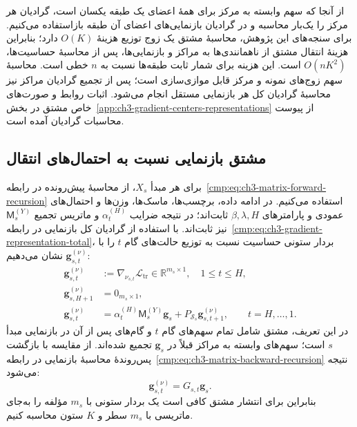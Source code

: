 از آنجا که سهم وابسته به مرکز برای همهٔ
اعضای یک طبقه یکسان است، گرادیان هر مرکز
را یک‌بار محاسبه و در گرادیان بازنمایی‌های
اعضای آن طبقه بازاستفاده می‌کنیم. برای سنجه‌های
این پژوهش، محاسبهٔ مشتق یک زوج توزیع هزینهٔ
$O(K)$ دارد؛ بنابراین هزینهٔ انتقال مشتق از
ناهمانندی‌ها به مراکز و بازنمایی‌ها، پس از
محاسبهٔ حساسیت‌ها، $O(nK^2)$ است. این هزینه
برای شمار ثابت طبقه‌ها نسبت به $n$ خطی است.
محاسبهٔ سهم زوج‌های نمونه و مرکز قابل موازی‌سازی
است؛ پس از تجمیع گرادیان مراکز نیز محاسبهٔ
گرادیان کل هر بازنمایی مستقل انجام می‌شود.
اثبات روابط و صورت‌های خاص مشتق در
بخش~\ref{app:ch3-gradient-centers-representations}
از پیوست محاسبات گرادیان آمده است.

\subsection{مشتق بازنمایی نسبت به احتمال‌های انتقال}
\label{cmp:subsec:ch3-gradient-exact-walk}

برای هر مبدأ $X_s$، از محاسبهٔ پیش‌رونده در
رابطه~\eqref{cmp:eq:ch3-matrix-forward-recursion}
استفاده می‌کنیم. در ادامه داده، برچسب‌ها،
ماسک‌ها، وزن‌ها و احتمال‌های عمودی و پارامترهای
$\beta,\lambda,H$ ثابت‌اند؛ در نتیجه ضرایب
$\alpha_t^{(H)}$ و ماتریس تجمیع
$\mathsf M_s^{(Y)}$ نیز ثابت‌اند.
با استفاده از گرادیان کل بازنمایی در
رابطه~\eqref{cmp:eq:ch3-gradient-representation-total}،
بردار ستونی حساسیت نسبت به توزیع حالت‌های گام
$t$ را با $\mathbf g_{s,t}^{(\nu)}$ نشان می‌دهیم:
\begin{equation}\label{cmp:eq:ch3-gradient-walk-adjoint}
\boxed{\begin{aligned}
\mathbf g_{s,t}^{(\nu)}
&:=\nabla_{\nu_{s,t}}\mathcal L_{\mathrm{tr}}
\in\mathbb R^{m_s\times1},\quad 1\le t\le H,\\
\mathbf g_{s,H+1}^{(\nu)}&=0_{m_s\times1},\\
\mathbf g_{s,t}^{(\nu)}
&=\alpha_t^{(H)}\mathsf M_s^{(Y)}\mathbf g_s
+P_{\mathcal S_s}\mathbf g_{s,t+1}^{(\nu)},
\qquad t=H,\ldots,1.
\end{aligned}}
\end{equation}
در این تعریف، مشتق شامل تمام سهم‌های گام $t$
و گام‌های پس از آن در بازنمایی مبدأ $s$ است؛
سهم‌های وابسته به مراکز قبلاً در $\mathbf g_s$
تجمیع شده‌اند. از مقایسه با بازگشت پس‌روندهٔ
محاسبهٔ بازنمایی در
رابطه~\eqref{cmp:eq:ch3-matrix-backward-recursion}
نتیجه می‌شود:
\begin{equation}\label{cmp:eq:ch3-gradient-walk-backward-equivalence}
\boxed{\mathbf g_{s,t}^{(\nu)}=G_{s,t}\mathbf g_s.}
\end{equation}
بنابراین برای انتشار مشتق کافی است یک بردار
ستونی با $m_s$ مؤلفه را به‌جای ماتریسی با
$m_s$ سطر و $K$ ستون محاسبه کنیم.

